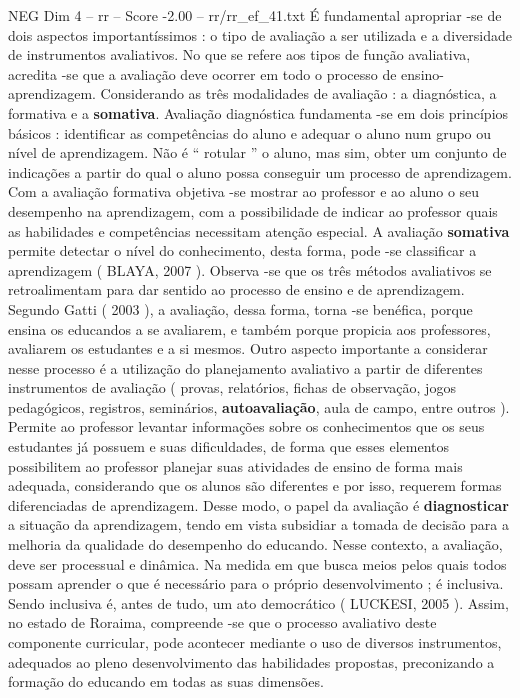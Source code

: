 \begin{textsample}{NEG Dim 4 – rr – Score -2.00 – rr/rr\_ef\_41.txt}
É fundamental apropriar -se de dois aspectos importantíssimos : o tipo de avaliação a ser utilizada e a diversidade de instrumentos avaliativos.
No que se refere aos tipos de função avaliativa, acredita -se que a avaliação deve ocorrer em todo o processo de ensino-aprendizagem.
Considerando as três modalidades de avaliação : a diagnóstica, a formativa e a \textbf{somativa}.
Avaliação diagnóstica fundamenta -se em dois princípios básicos : identificar as competências do aluno e adequar o aluno num grupo ou nível de aprendizagem.
Não é “ rotular ” o aluno, mas sim, obter um conjunto de indicações a partir do qual o aluno possa conseguir um processo de aprendizagem.
Com a avaliação formativa objetiva -se mostrar ao professor e ao aluno o seu desempenho na aprendizagem, com a possibilidade de indicar ao professor quais as habilidades e competências necessitam atenção especial.
A avaliação \textbf{somativa} permite detectar o nível do conhecimento, desta forma, pode -se classificar a aprendizagem ( BLAYA, 2007 ).
Observa -se que os três métodos avaliativos se retroalimentam para dar sentido ao processo de ensino e de aprendizagem.
Segundo Gatti ( 2003 ), a avaliação, dessa forma, torna -se benéfica, porque ensina os educandos a se avaliarem, e também porque propicia aos professores, avaliarem os estudantes e a si mesmos.
Outro aspecto importante a considerar nesse processo é a utilização do planejamento avaliativo a partir de diferentes instrumentos de avaliação ( provas, relatórios, fichas de observação, jogos pedagógicos, registros, seminários, \textbf{autoavaliação}, aula de campo, entre outros ).
Permite ao professor levantar informações sobre os conhecimentos que os seus estudantes já possuem e suas dificuldades, de forma que esses elementos possibilitem ao professor planejar suas atividades de ensino de forma mais adequada, considerando que os alunos são diferentes e por isso, requerem formas diferenciadas de aprendizagem.
Desse modo, o papel da avaliação é \textbf{diagnosticar} a situação da aprendizagem, tendo em vista subsidiar a tomada de decisão para a melhoria da qualidade do desempenho do educando.
Nesse contexto, a avaliação, deve ser processual e dinâmica.
Na medida em que busca meios pelos quais todos possam aprender o que é necessário para o próprio desenvolvimento ; é inclusiva.
Sendo inclusiva é, antes de tudo, um ato democrático ( LUCKESI, 2005 ).
Assim, no estado de Roraima, compreende -se que o processo avaliativo deste componente curricular, pode acontecer mediante o uso de diversos instrumentos, adequados ao pleno desenvolvimento das habilidades propostas, preconizando a formação do educando em todas as suas dimensões.

\end{textsample}
